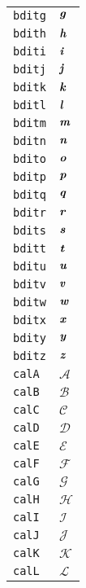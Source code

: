 \begin{longtable}{ll}
\texttt{bditg}&${}{\textbf{\textit{g}}}{}$\\
\texttt{bdith}&${}{\textbf{\textit{h}}}{}$\\
\texttt{bditi}&${}{\textbf{\textit{i}}}{}$\\
\texttt{bditj}&${}{\textbf{\textit{j}}}{}$\\
\texttt{bditk}&${}{\textbf{\textit{k}}}{}$\\
\texttt{bditl}&${}{\textbf{\textit{l}}}{}$\\
\texttt{bditm}&${}{\textbf{\textit{m}}}{}$\\
\texttt{bditn}&${}{\textbf{\textit{n}}}{}$\\
\texttt{bdito}&${}{\textbf{\textit{o}}}{}$\\
\texttt{bditp}&${}{\textbf{\textit{p}}}{}$\\
\texttt{bditq}&${}{\textbf{\textit{q}}}{}$\\
\texttt{bditr}&${}{\textbf{\textit{r}}}{}$\\
\texttt{bdits}&${}{\textbf{\textit{s}}}{}$\\
\texttt{bditt}&${}{\textbf{\textit{t}}}{}$\\
\texttt{bditu}&${}{\textbf{\textit{u}}}{}$\\
\texttt{bditv}&${}{\textbf{\textit{v}}}{}$\\
\texttt{bditw}&${}{\textbf{\textit{w}}}{}$\\
\texttt{bditx}&${}{\textbf{\textit{x}}}{}$\\
\texttt{bdity}&${}{\textbf{\textit{y}}}{}$\\
\texttt{bditz}&${}{\textbf{\textit{z}}}{}$\\
\texttt{calA}&${}{\mathcal{A}}{}$\\
\texttt{calB}&${}{\mathcal{B}}{}$\\
\texttt{calC}&${}{\mathcal{C}}{}$\\
\texttt{calD}&${}{\mathcal{D}}{}$\\
\texttt{calE}&${}{\mathcal{E}}{}$\\
\texttt{calF}&${}{\mathcal{F}}{}$\\
\texttt{calG}&${}{\mathcal{G}}{}$\\
\texttt{calH}&${}{\mathcal{H}}{}$\\
\texttt{calI}&${}{\mathcal{I}}{}$\\
\texttt{calJ}&${}{\mathcal{J}}{}$\\
\texttt{calK}&${}{\mathcal{K}}{}$\\
\texttt{calL}&${}{\mathcal{L}}{}$\\

\end{longtable}
